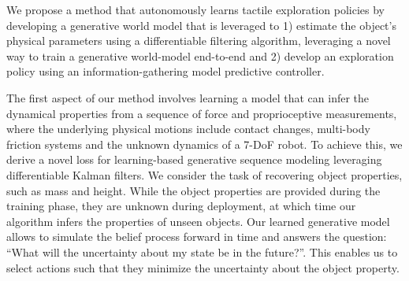 \documentclass[anon]{l4dc2024}
\begin{document}
We propose a method that autonomously learns tactile exploration policies by developing a generative world model that is leveraged to
1) estimate the object’s physical parameters using a differentiable filtering algorithm, leveraging a novel way to train a generative world-model end-to-end and
2) develop an exploration policy using an information-gathering model predictive controller.




The first aspect of our method involves learning a model that can infer the dynamical properties from a sequence of force and proprioceptive measurements, where the underlying physical motions include contact changes, multi-body friction systems and the unknown dynamics of a 7-DoF robot.
To achieve this, we derive a novel loss for learning-based generative sequence modeling leveraging differentiable Kalman filters.
We consider the task of recovering object properties, such as mass and height.
While the object properties are provided during the training phase, they are unknown  during deployment, at which time our algorithm infers the properties of unseen objects.
Our learned generative model allows to simulate the belief process forward in time and answers the question: ``What will the uncertainty about my state be in the future?''.
This enables us to select actions such that they minimize the uncertainty about the object property.
\end{document}
